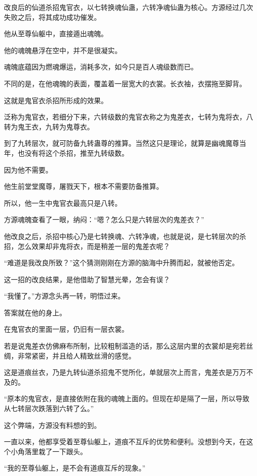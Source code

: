 
\begin{this_body}

改良后的仙道杀招鬼官衣，以七转换魂仙蛊，六转净魂仙蛊为核心。方源经过几次失败之后，将其成功成功催发。

他从至尊仙躯中，直接遁出魂魄。

他的魂魄悬浮在空中，并不是很凝实。

魂魄底蕴因为燃魂爆运，消耗多次，如今只是百人魂级数而已。

不同的是，在他魂魄的表面，覆盖着一层宽大的衣裳。长衣袖，衣摆拖至脚背。

这就是鬼官衣杀招所形成的效果。

泛称为鬼官衣，若细分下来，六转级数的鬼官衣称之为鬼差衣，七转为鬼将衣，八转为鬼王衣，九转为鬼尊衣。

到了九转层次，就可防备九转蛊尊的推算。当然这只是理论，就算是幽魂魔尊当年，也没有将这个杀招，推至九转级数。

因为他不需要。

他生前堂堂魔尊，屠戮天下，根本不需要防备推算。

所以，他一生中鬼官衣最高只是八转。

方源魂魄查看了一眼，纳闷：“嗯？怎么只是六转层次的鬼差衣？”

他改良之后，杀招中核心乃是七转换魂、六转净魂，也就是说，是七转层次的杀招，怎么效果却非鬼将衣，而是稍差一层的鬼差衣呢？

“难道是我改良所致？”这个猜测刚刚在方源的脑海中升腾而起，就被他否定。

这一招的改良结果，是他借助了智慧光晕，怎会有误？

“我懂了。”方源念头再一转，明悟过来。

答案就在他的身上。

在鬼官衣的里面一层，仍旧有一层衣裳。

若是说鬼差衣仿佛麻布所制，比较粗制滥造的话，那么这层内里的衣裳却是宛若丝绸，非常紧密，并且给人精致丝滑的感觉。

这是道痕丝衣，乃是九转仙道杀招鬼不觉所化，单就层次上而言，鬼差衣是万万不及的。

“原本的鬼官衣，是直接依附在我的魂魄上面的。但现在却是隔了一层，所以导致从七转层次跌落到六转了么。”

这个弊端，方源没有料想的到。

一直以来，他都享受着至尊仙躯上，道痕不互斥的优势和便利。没想到今天，在这个小角落里栽了一下跟头。

“我的至尊仙躯上，是不会有道痕互斥的现象。”


\end{this_body}
